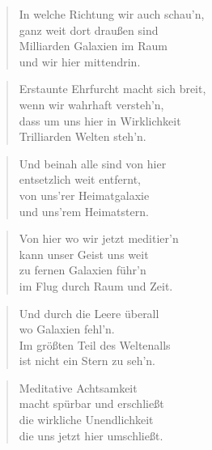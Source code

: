 \documentclass[10pt,a4paper]{article}
\begin{document}
\begin{multicols}{2}
\begin{verse}
In welche Richtung wir auch schau’n, \\
ganz weit dort draußen sind \\
Milliarden Galaxien im Raum \\
und wir hier mittendrin. \\
\end{verse}

\begin{verse}
Erstaunte Ehrfurcht macht sich breit, \\
wenn wir wahrhaft versteh’n, \\
dass um uns hier in Wirklichkeit \\
Trilliarden Welten steh’n. \\
\end{verse}

\begin{verse}
Und beinah alle sind von hier \\
entsetzlich weit entfernt, \\
von uns’rer Heimatgalaxie \\
und uns’rem Heimatstern. \\
\end{verse}

\begin{verse}
Von hier wo wir jetzt meditier’n \\
kann unser Geist uns weit \\
zu fernen Galaxien führ’n \\
im Flug durch Raum und Zeit. \\
\end{verse}

\begin{verse}
Und durch die Leere überall \\
wo Galaxien fehl’n. \\
Im größten Teil des Weltenalls \\
ist nicht ein Stern zu seh’n. \\
\end{verse}

\begin{verse}
Meditative Achtsamkeit \\
macht spürbar und erschließt \\
die wirkliche Unendlichkeit \\
die uns jetzt hier umschließt. \\
\end{verse}


\end{multicols}
\end{document}
